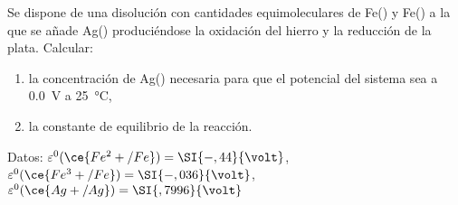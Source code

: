 Se dispone de una disolución con cantidades equimoleculares de \mbox{Fe()} y \mbox{Fe()} a la que se añade \mbox{Ag()} produciéndose la oxidación del hierro y la reducción de la plata. Calcular:
\begin{enumerate}[label={\alph*)},font={\bfseries}]
	\item la concentración de \mbox{Ag()} necesaria para que el potencial del sistema sea a \SI{0,0}{\volt} a \SI{25}{\celsius},
	\item la constante de equilibrio de la reacción.
\end{enumerate}
Datos: $\varepsilon^0(\ce{Fe^2+/Fe})=\SI{-,44}{\volt}$, $\varepsilon^0(\ce{Fe^3+/Fe})=\SI{-,036}{\volt}$, $\varepsilon^0(\ce{Ag+/Ag})=\SI{,7996}{\volt}$
